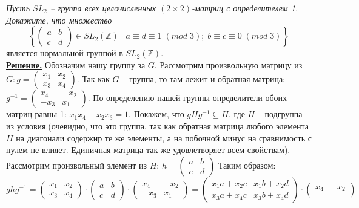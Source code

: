 \documentclass[14pt,a4paper]{scrartcl}
\begin{document}
\begin{spacing}{1}
	
\begin{center}
\end{center}
	\textit{Пусть $SL_2$ -- группа всех целочисленных $(2\times 2)$-матриц с определителем 1. Докажите, что множество
		$$
		\left\{\begin{pmatrix}
		a & b\\
		c & d
		\end{pmatrix} \in SL_2(\mathbb{Z})\;|\;a \equiv d \equiv 1\; (mod\; 3);\;	b \equiv c \equiv 0\;(mod\;3)\right\}
		$$}
	является нормальной группой в $SL_2(\mathbb{Z})$.\\
	\noindent \textbf{\underline{Решение.}} Обозначим нашу группу за $G$. Рассмотрим произвольную матрицу из $G :g =  \begin{pmatrix}
	x_1 & x_2\\
	x_3 & x_4
	\end{pmatrix}$. Так как $G$ -- группа, то там лежит и обратная матрица: $g^{-1} = \begin{pmatrix}
	x_4 & -x_2\\
	-x_3 & x_1
	\end{pmatrix}$. По определению нашей группы определители обоих матриц равны 1: $x_1x_4 - x_2x_3 = 1$. Покажем, что $gHg^{-1} \subseteq H$, где $H$ -- подгруппа из условия.(очевидно, что это группа, так как обратная матрица любого элемента $H$ на диагонали содержир те же элементы, а на побочной минус на сравнимость с нулем не влияет. Единичная матрица так же удовлетворяет всем свойствам). Рассмотрим произвольный элемент из $H$: $h = \begin{pmatrix}
		a & b \\
		c & d
	\end{pmatrix} $
	Таким образом:
	$$
	ghg^{-1} = \begin{pmatrix}
	x_1 & x_2\\
	x_3 & x_4
	\end{pmatrix} \cdot 
	\begin{pmatrix}
	a & b \\
	c & d
	\end{pmatrix} \cdot
	\begin{pmatrix}
	x_4 & -x_2\\
	-x_3 & x_1
	\end{pmatrix} = 
	\begin{pmatrix}
	x_1a+x_2c & x_1b+x_2d\\
	x_3a + x_4c & x_3b + x_4d
	\end{pmatrix}	\cdot
	\begin{pmatrix}
	x_4 & -x_2\\

\end{pmatrix}$$
\end{spacing}
\end{document}
